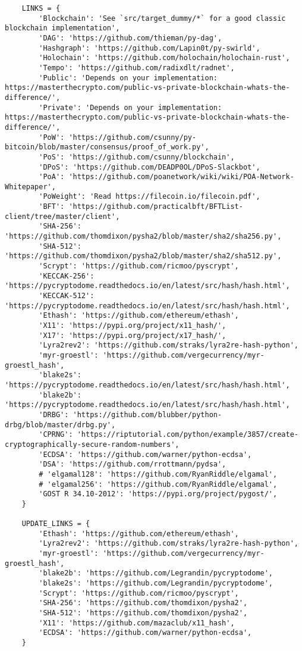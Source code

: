 \begin{lstlisting}
    LINKS = {
        'Blockchain': 'See `src/target_dummy/*` for a good classic blockchain implementation',
        'DAG': 'https://github.com/thieman/py-dag',
        'Hashgraph': 'https://github.com/Lapin0t/py-swirld',
        'Holochain': 'https://github.com/holochain/holochain-rust',
        'Tempo': 'https://github.com/radixdlt/radnet',
        'Public': 'Depends on your implementation: https://masterthecrypto.com/public-vs-private-blockchain-whats-the-difference/',
        'Private': 'Depends on your implementation: https://masterthecrypto.com/public-vs-private-blockchain-whats-the-difference/',
        'PoW': 'https://github.com/csunny/py-bitcoin/blob/master/consensus/proof_of_work.py',
        'PoS': 'https://github.com/csunny/blockchain',
        'DPoS': 'https://github.com/DEADP0OL/DPoS-Slackbot',
        'PoA': 'https://github.com/poanetwork/wiki/wiki/POA-Network-Whitepaper',
        'PoWeight': 'Read https://filecoin.io/filecoin.pdf',
        'BFT': 'https://github.com/practicalbft/BFTList-client/tree/master/client',
        'SHA-256': 'https://github.com/thomdixon/pysha2/blob/master/sha2/sha256.py',
        'SHA-512': 'https://github.com/thomdixon/pysha2/blob/master/sha2/sha512.py',
        'Scrypt': 'https://github.com/ricmoo/pyscrypt',
        'KECCAK-256': 'https://pycryptodome.readthedocs.io/en/latest/src/hash/hash.html',
        'KECCAK-512': 'https://pycryptodome.readthedocs.io/en/latest/src/hash/hash.html',
        'Ethash': 'https://github.com/ethereum/ethash',
        'X11': 'https://pypi.org/project/x11_hash/',
        'X17': 'https://pypi.org/project/x17_hash/',
        'Lyra2rev2': 'https://github.com/straks/lyra2re-hash-python',
        'myr-groestl': 'https://github.com/vergecurrency/myr-groestl_hash',
        'blake2s': 'https://pycryptodome.readthedocs.io/en/latest/src/hash/hash.html',
        'blake2b': 'https://pycryptodome.readthedocs.io/en/latest/src/hash/hash.html',
        'DRBG': 'https://github.com/blubber/python-drbg/blob/master/drbg.py',
        'CPRNG': 'https://riptutorial.com/python/example/3857/create-cryptographically-secure-random-numbers',
        'ECDSA': 'https://github.com/warner/python-ecdsa',
        'DSA': 'https://github.com/rrottmann/pydsa',
        # 'elgamal128': 'https://github.com/RyanRiddle/elgamal',
        # 'elgamal256': 'https://github.com/RyanRiddle/elgamal',
        'GOST R 34.10-2012': 'https://pypi.org/project/pygost/',
    }

    UPDATE_LINKS = {
        'Ethash': 'https://github.com/ethereum/ethash',
        'Lyra2rev2': 'https://github.com/straks/lyra2re-hash-python',
        'myr-groestl': 'https://github.com/vergecurrency/myr-groestl_hash',
        'blake2b': 'https://github.com/Legrandin/pycryptodome',
        'blake2s': 'https://github.com/Legrandin/pycryptodome',
        'Scrypt': 'https://github.com/ricmoo/pyscrypt',
        'SHA-256': 'https://github.com/thomdixon/pysha2',
        'SHA-512': 'https://github.com/thomdixon/pysha2',
        'X11': 'https://github.com/mazaclub/x11_hash',
        'ECDSA': 'https://github.com/warner/python-ecdsa',
    }


\end{lstlisting}
